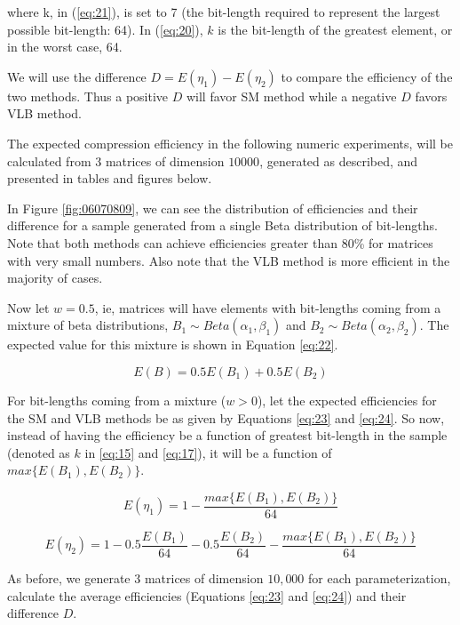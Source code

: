 \documentclass[10pt]{article}
\begin{document}
\noindent where k, in (\ref{eq:21}), is set to 7 (the bit-length required to 
represent the largest possible bit-length: 64). In (\ref{eq:20}), $k$ is the 
bit-length of the greatest element, or in the worst case, 64.

We will use the difference $D=E(\eta_1)-E(\eta_2)$ to compare the efficiency of 
the two methods. Thus a positive $D$ will favor SM method while a negative $D$ 
favors VLB method.

The expected compression efficiency in the following numeric experiments, will 
be calculated from $3$ matrices of dimension $10000$, generated as described, 
and presented in tables and figures below.
 
In Figure \ref{fig:06070809}, we can see the distribution of efficiencies and 
their difference for a sample generated from a single Beta distribution of 
bit-lengths. Note that both methods can achieve efficiencies greater than 80\% 
for matrices with very small numbers. Also note that the VLB method is more 
efficient in the majority of cases. 
 
Now let $w = 0.5$, ie, matrices will have elements with bit-lengths coming 
from a mixture of beta distributions, $B_1\sim Beta(\alpha_1,\beta_1)$ and 
$B_2\sim Beta(\alpha_2,\beta_2)$. The expected value for this mixture is shown 
in Equation \ref{eq:22}.
 
\begin{equation}\label{eq:22}
 E(B) = 0.5 E(B_1) + 0.5 E(B_2)
\end{equation}
 
For bit-lengths coming from a mixture ($w>0$), let the expected efficiencies for 
the SM and VLB methods be as given by Equations \ref{eq:23} and \ref{eq:24}. So 
now, instead of having the efficiency be a function of greatest bit-length in 
the sample (denoted as  $k$ in \ref{eq:15} and \ref{eq:17}), it will be a 
function of $max\{E(B_1),E(B_2)\}$. 

\begin{equation}\label{eq:23}
 E(\eta_1) = 1 - \frac{max\{E(B_1),E(B_2)\}}{64}
\end{equation}

\begin{equation}\label{eq:24}
 E(\eta_2) = 1 - 0.5\frac{E(B_1)}{64} - 0.5\frac{E(B_2)}{64} - \frac{max\{E(B_1),E(B_2)\}}{64}
\end{equation}
 
As before, we generate 3 matrices of dimension $10,000$ for each 
parameterization, calculate the average efficiencies (Equations \ref{eq:23} and 
\ref{eq:24}) and their difference $D$.
\end{document}
